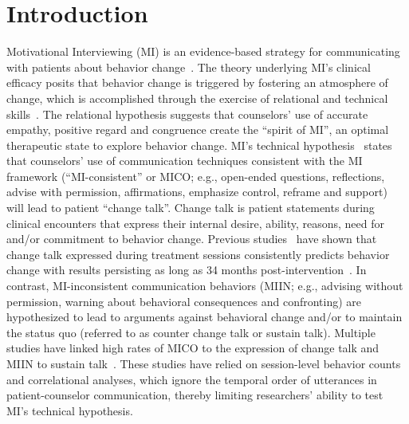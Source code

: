 \section{Introduction}
\label{sec:intro}
Motivational Interviewing (MI) is an evidence-based strategy for communicating with patients about behavior change~\cite{miller2013motivational}. The theory underlying MI's clinical efficacy posits that behavior change is triggered by fostering an atmosphere of change, which is accomplished through the exercise of relational and technical skills~\cite{miller2013motivational}. The relational hypothesis suggests that counselors' use of accurate empathy, positive regard and congruence create the ``spirit of MI'', an optimal therapeutic state to explore behavior change. MI's technical hypothesis~\cite{miller2009toward} states that counselors' use of communication techniques consistent with the MI framework (``MI-consistent'' or MICO; e.g., open-ended questions, reflections, advise with permission, affirmations, emphasize control, reframe and support) will lead to patient ``change talk''. Change talk is patient statements during clinical encounters that express their internal desire, ability, reasons, need for and/or commitment to behavior change. Previous studies~\cite{apodaca2009mechanisms} have shown that change talk expressed during treatment sessions consistently predicts behavior change with results persisting as long as 34 months post-intervention~\cite{walker2011influence}. In contrast, MI-inconsistent communication behaviors (MIIN; e.g., advising without permission, warning about behavioral consequences and confronting) are hypothesized to lead to arguments against behavioral change and/or to maintain the status quo (referred to as counter change talk or sustain talk). Multiple studies have linked high rates of MICO to the expression of change talk and MIIN to sustain talk~\cite{magill2014technical}. These studies have relied on session-level behavior counts and correlational analyses, which ignore the temporal order of utterances in patient-counselor communication, thereby limiting researchers' ability to test MI's technical hypothesis. 

